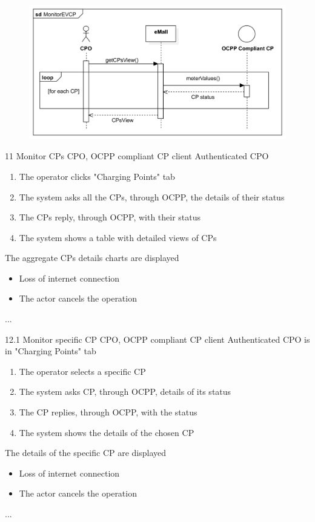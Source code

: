 \usecase
{
    \begin{figure}[H]
        \centering
        \includegraphics[scale=0.9]{src/sequence_diagram/monitorEVCP.png}
    \end{figure}
}
{11}
{Monitor CPs} %
{CPO, OCPP compliant CP client} %
{Authenticated CPO} %
{ %
    \begin{enumerate}
        \item The operator clicks "Charging Points" tab
        \item The system asks all the CPs, through OCPP, the details of their status
        \item The CPs reply, through OCPP, with their status
        \item The system shows a table with detailed views of CPs
    \end{enumerate}
}
{The aggregate CPs details charts are displayed} %
{ %
    \begin{itemize}
        \item Loss of internet connection
        \item The actor cancels the operation
    \end{itemize}
}
{ %
    ...
}

\usecase
{

}
{12.1}
{Monitor specific CP} %
{CPO, OCPP compliant CP client} %
{Authenticated CPO is in "Charging Points" tab} %
{ %
    \begin{enumerate}
        \item The operator selects a specific CP
        \item The system asks CP, through OCPP, details of its status
        \item The CP replies, through OCPP, with the status
        \item The system shows the details of the chosen CP
    \end{enumerate}
}
{The details of the specific CP are displayed} %
{ %
    \begin{itemize}
        \item Loss of internet connection
        \item The actor cancels the operation
    \end{itemize}
}
{ %
    ...
}


